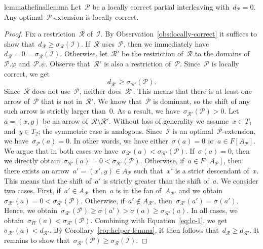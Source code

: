 \documentclass[11pt]{article}
\newcommand{\shift}[1]{\sigma_{#1}}
\newcommand{\resdist}[1]{d_{#1}}
\renewcommand{\phi}{\varphi}
\newcommand{\I}{\mathcal{I}}
\renewcommand{\P}{\mathcal{P}}
\newcommand{\R}{\mathcal{R}}
\begin{document}
%
\begin{restatable}{lemma}{thefinallemma}
\label{lem:optimal-extension-locally-correct}
    Let~$\P$ be a locally correct partial interleaving with~$\resdist{\P} = 0$.
    Any optimal~$\P$-extension is locally correct.
\end{restatable}
\begin{proof}
    Fix a restriction~$\R$ of~$\I$.
    By Observation~\ref{obs:locally-correct} it suffices to show that~$\resdist{\R} \ge \shift{\R}(\I)$.
    If~$\R$ uses~$\P$, then we immediately have~$\resdist{\R} = 0 = \shift{\R}(\I)$.
    Otherwise, let~$\R'$ be the restriction of~$\R$ to the domains of~$\P.\phi$ and~$\P.\psi$.
    Observe that~$\R'$ is also a restriction of~$\P$.
    Since~$\P$ is locally correct, we get
    \begin{equation}\label{eq:lc-1}
    \resdist{\R'} \ge \shift{\R'}(\P).
    \end{equation}
%
    Since~$\R$ does not use~$\P$, neither does~$\R'$.
    This means that there is at least one arrow of~$\P$ that is not in~$\R'$.
    We know that~$\P$ is dominant, so the shift of any such arrow is strictly larger than~$0$.
    As a result, we have~$\shift{\R'}(\P) > 0$.
%
    Let~$a = (x, y)$ be an arrow of~$\R \setminus \R'$.
    Without loss of generality we assume~$x \in T_1$ and~$y \in T_2$; the symmetric case is analogous.
    Since~$\I$ is an optimal~$\P$-extension, we have~$\shift{\P}(a) = 0$.
    In other words, we have either~$\shift{}(a) = 0$ or~$a \in F[A_\P]$.
    We argue that in both cases we have~$\shift{\R'}(a) < \shift{\R'}(\P)$.
    If~$\shift{}(a) = 0$, then we directly obtain~$\shift{\R'}(a) = 0 < \shift{\R'}(\P)$.
    Otherwise, if~$a \in F[A_\P]$, then there exists an arrow~$a' = (x', y) \in A_\P$ such that~$x'$ is a strict descendant of~$x$.
    This means that the shift of~$a'$ is strictly greater than the shift of~$a$.
    We consider two cases.
    First, if~$a' \in A_{\R'}$ then~$a$ is in the fan of~$A_{\R'}$ and we obtain~$\shift{\R'}(a) = 0 < \shift{\R'}(\P)$.
    Otherwise, if~$a' \notin A_{\R'}$, then~$\shift{\R'}(a') = \shift{}(a')$.
    Hence, we obtain~$\shift{\R'}(\P) \ge \shift{}(a') > \shift{}(a) \ge \shift{\R'}(a)$.
    In all cases, we obtain~$\shift{R'}(a) < \shift{\R'}(\P)$.
    Combining with Equation~\eqref{eq:lc-1}, we get~$\shift{\R'}(a) < \resdist{\R'}$.
    By Corollary~\ref{cor:helper-lemma}, it then follows that~$\resdist{\R} \ge \resdist{\R'}$.
%
    It remains to show that~$\shift{\R'}(\P) \ge \shift{\R}(\I)$.

\end{proof}
\end{document}
